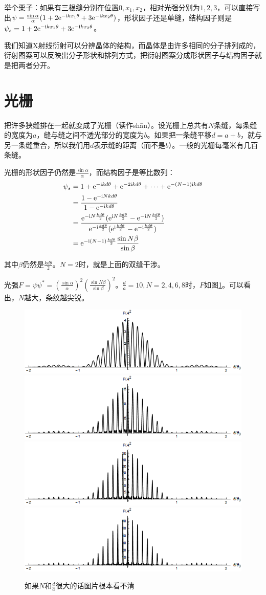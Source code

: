举个栗子：如果有三根缝分别在位置$0,x_1,x_2$，相对光强分别为$1,2,3$，可以直接写出$\psi=\frac{\sin \alpha}{\alpha}(1+2 \mathrm{e}^{-\mathrm{i} k x_1 \theta}+3 \mathrm{e}^{-\mathrm{i} k x_2 \theta})$，形状因子还是单缝，结构因子则是$\psi_s=1+2 \mathrm{e}^{-\mathrm{i} k x_1 \theta}+3 \mathrm{e}^{-\mathrm{i} k x_2 \theta}$。

我们知道X射线衍射可以分辨晶体的结构，而晶体是由许多相同的分子排列成的，衍射图案可以反映出分子形状和排列方式，把衍射图案分成形状因子与结构因子就是把两者分开。
\section{光栅}
把许多狭缝排在一起就变成了光栅（读作shān）。设光栅上总共有$N$条缝，每条缝的宽度为$a$，缝与缝之间不透光部分的宽度为$b$。如果把一条缝平移$d=a+b$，就与另一条缝重合，所以我们用$d$表示缝的距离（而不是$b$）。一般的光栅每毫米有几百条缝。

光栅的形状因子仍然是$\frac{\sin \alpha}{\alpha}$，而结构因子是等比数列：
\begin{align*}
\psi_s&=1+\mathrm{e}^{-\mathrm{i} k d \theta}+\mathrm{e}^{-2 \mathrm{i} k d \theta}+\dots+\mathrm{e}^{-(N-1) \mathrm{i} k d \theta} \\
&=\frac{1-\mathrm{e}^{-\mathrm{i} N k d \theta}}{1-\mathrm{e}^{-\mathrm{i} k d \theta}} \\
&=\frac{\mathrm{e}^{-\mathrm{i} N \frac{k d \theta}{2}} (\mathrm{e}^{\mathrm{i} N \frac{k d \theta}{2}}-\mathrm{e}^{-\mathrm{i} N \frac{k d \theta}{2}})}{\mathrm{e}^{-\mathrm{i} \frac{k d \theta}{2}} (\mathrm{e}^{\mathrm{i} \frac{k d \theta}{2}}-\mathrm{e}^{-\mathrm{i} \frac{k d \theta}{2}})} \\
&=\mathrm{e}^{-\mathrm{i} (N-1) \frac{k d \theta}{2}} \frac{\sin N \beta}{\sin \beta}
\end{align*}

其中$\beta$仍然是$\frac{k d \theta}{2}$。$N=2$时，就是上面的双缝干涉。

光强$F=\psi \psi^*=(\frac{\sin \alpha}{\alpha})^2 (\frac{\sin N \beta}{\sin \beta})^2$。$\frac{d}{a}=10,N=2,4,6,8$时，$F$如图\ref{fig-grate}。可以看出，$N$越大，条纹越尖锐。
\begin{figure}[htb]
\centering
\includegraphics[width=0.33\linewidth]{fig/grate-2.png}
\includegraphics[width=0.33\linewidth]{fig/grate-4.png} \\
\includegraphics[width=0.33\linewidth]{fig/grate-6.png}
\includegraphics[width=0.33\linewidth]{fig/grate-8.png}
\caption{如果$N$和$\frac{d}{a}$很大的话图片根本看不清}
\label{fig-grate}
\end{figure}
